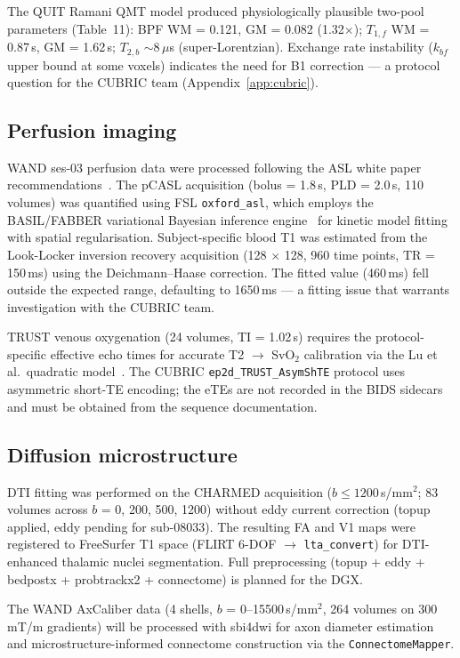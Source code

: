 \documentclass[11pt,a4paper]{article}\usepackage[]{graphicx}\usepackage[]{xcolor}
\begin{document}
The QUIT Ramani QMT model produced physiologically plausible two-pool
parameters (Table~11): BPF WM = 0.121, GM = 0.082 (1.32$\times$);
$T_{1,f}$ WM = 0.87\,s, GM = 1.62\,s; $T_{2,b}$ $\sim$8\,$\mu$s
(super-Lorentzian). Exchange rate instability ($k_{bf}$ upper bound
at some voxels) indicates the need for B1 correction --- a protocol
question for the CUBRIC team (Appendix~\ref{app:cubric}).

\subsection{Perfusion imaging}

WAND ses-03 perfusion data were processed following the ASL white paper
recommendations~\citep{Alsop2015asl}. The pCASL acquisition (bolus =
1.8\,s, PLD = 2.0\,s, 110 volumes) was quantified using FSL
\texttt{oxford\_asl}, which employs the BASIL/FABBER variational
Bayesian inference engine~\citep{Chappell2009basil} for kinetic model
fitting with spatial regularisation. Subject-specific blood T1 was
estimated from the Look-Locker inversion recovery acquisition (128
$\times$ 128, 960 time points, TR = 150\,ms) using the
Deichmann--Haase correction. The fitted value (460\,ms) fell outside
the expected range, defaulting to 1650\,ms --- a fitting issue that
warrants investigation with the CUBRIC team.

TRUST venous oxygenation (24 volumes, TI = 1.02\,s) requires the
protocol-specific effective echo times for accurate T2 $\to$
SvO$_2$ calibration via the Lu et al.\ quadratic
model~\citep{Lu2012bloodt2}. The CUBRIC
\texttt{ep2d\_TRUST\_AsymShTE} protocol uses asymmetric short-TE
encoding; the eTEs are not recorded in the BIDS sidecars and must
be obtained from the sequence documentation.

\subsection{Diffusion microstructure}

DTI fitting was performed on the CHARMED acquisition ($b \leq
1200$\,s/mm$^2$; 83 volumes across $b$ = 0, 200, 500, 1200) without
eddy current correction (topup applied, eddy pending for sub-08033).
The resulting FA and V1 maps were registered to FreeSurfer T1 space
(FLIRT 6-DOF $\to$ \texttt{lta\_convert}) for DTI-enhanced thalamic
nuclei segmentation. Full preprocessing (topup + eddy + bedpostx +
probtrackx2 + connectome) is planned for the DGX.

The WAND AxCaliber data (4 shells, $b$ = 0--15500\,s/mm$^2$, 264
volumes on 300\,mT/m gradients) will be processed with sbi4dwi for
axon diameter estimation and microstructure-informed connectome
construction via the \texttt{ConnectomeMapper}.
\end{document}
